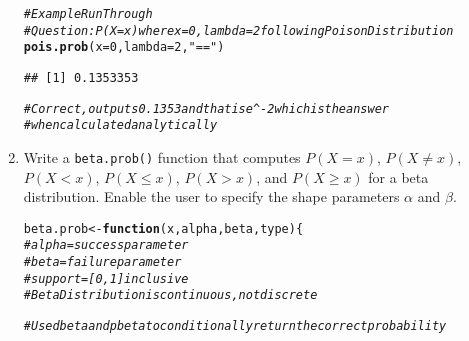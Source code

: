 \documentclass{article}\usepackage[]{graphicx}\usepackage[]{xcolor}
\makeatletter
\newcommand{\hlnum}[1]{\textcolor[rgb]{0.686,0.059,0.569}{#1}}%
\newcommand{\hlsng}[1]{\textcolor[rgb]{0.192,0.494,0.8}{#1}}%
\newcommand{\hlcom}[1]{\textcolor[rgb]{0.678,0.584,0.686}{\textit{#1}}}%
\newcommand{\hldef}[1]{\textcolor[rgb]{0.345,0.345,0.345}{#1}}%
\newcommand{\hlkwa}[1]{\textcolor[rgb]{0.161,0.373,0.58}{\textbf{#1}}}%
\newcommand{\hlkwb}[1]{\textcolor[rgb]{0.69,0.353,0.396}{#1}}%
\newcommand{\hlkwc}[1]{\textcolor[rgb]{0.333,0.667,0.333}{#1}}%
\newcommand{\hlkwd}[1]{\textcolor[rgb]{0.737,0.353,0.396}{\textbf{#1}}}%
\newenvironment{kframe}{%
 \def\at@end@of@kframe{}%
 \ifinner\ifhmode%
  \def\at@end@of@kframe{\end{minipage}}%
  \begin{minipage}{\columnwidth}%
 \fi\fi%
 \def\FrameCommand##1{\hskip\@totalleftmargin \hskip-\fboxsep
 \colorbox{shadecolor}{##1}\hskip-\fboxsep
     \hskip-\linewidth \hskip-\@totalleftmargin \hskip\columnwidth}%
 \MakeFramed {\advance\hsize-\width
   \@totalleftmargin\z@ \linewidth\hsize
   \@setminipage}}%
 {\par\unskip\endMakeFramed%
 \at@end@of@kframe}
\newenvironment{knitrout}{}{} %
\makeatother
\begin{document}
\begin{enumerate}
\begin{knitrout}
\begin{kframe}
\begin{alltt}
\hlcom{# Example Run Through}
\hlcom{# Question: P( X = x) where x = 0, lambda = 2 following Poison Distribution}
\hlkwd{pois.prob}\hldef{(}\hlkwc{x} \hldef{=} \hlnum{0}\hldef{,} \hlkwc{lambda} \hldef{=} \hlnum{2}\hldef{,}\hlsng{"=="}\hldef{)}
\end{alltt}
\begin{verbatim}
## [1] 0.1353353
\end{verbatim}
\begin{alltt}
\hlcom{# Correct, outputs 0.1353 and that is e^-2 which is the answer}
\hlcom{#when calculated analytically}
\end{alltt}
\end{kframe}
\end{knitrout}
    \item Write a \texttt{beta.prob()} function that computes $P(X=x)$, 
    $P(X \neq x)$, $P(X<x)$, $P(X \leq x)$, $P(X > x)$, and $P(X \geq x)$
    for a beta distribution. Enable the user to specify the shape parameters
    $\alpha$ and $\beta$.
\begin{knitrout}\scriptsize
{}\color{fgcolor}\begin{kframe}
\begin{alltt}
\hldef{beta.prob} \hlkwb{<-} \hlkwa{function}\hldef{(}\hlkwc{x}\hldef{,} \hlkwc{alpha}\hldef{,} \hlkwc{beta}\hldef{,} \hlkwc{type}\hldef{)\{}
  \hlcom{# alpha = success parameter}
  \hlcom{# beta = failure parameter}
  \hlcom{# support = [0,1] inclusive}
  \hlcom{# Beta Distribution is continuous, not discrete}


  \hlcom{# Use dbeta and pbeta to conditionally return the correct probability}


\end{alltt}
\end{kframe}
\end{knitrout}
\end{enumerate}
\end{document}
